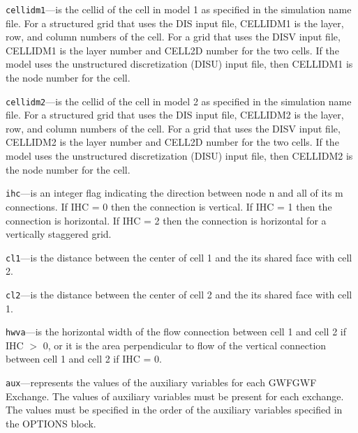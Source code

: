 \begin{description}
\item \texttt{cellidm1}---is the cellid of the cell in model 1 as specified in the simulation name file. For a structured grid that uses the DIS input file, CELLIDM1 is the layer, row, and column numbers of the cell.   For a grid that uses the DISV input file, CELLIDM1 is the layer number and CELL2D number for the two cells.  If the model uses the unstructured discretization (DISU) input file, then CELLIDM1 is the node number for the cell.

\item \texttt{cellidm2}---is the cellid of the cell in model 2 as specified in the simulation name file. For a structured grid that uses the DIS input file, CELLIDM2 is the layer, row, and column numbers of the cell.   For a grid that uses the DISV input file, CELLIDM2 is the layer number and CELL2D number for the two cells.  If the model uses the unstructured discretization (DISU) input file, then CELLIDM2 is the node number for the cell.

\item \texttt{ihc}---is an integer flag indicating the direction between node n and all of its m connections. If IHC = 0 then the connection is vertical.  If IHC = 1 then the connection is horizontal. If IHC = 2 then the connection is horizontal for a vertically staggered grid.

\item \texttt{cl1}---is the distance between the center of cell 1 and the its shared face with cell 2.

\item \texttt{cl2}---is the distance between the center of cell 2 and the its shared face with cell 1.

\item \texttt{hwva}---is the horizontal width of the flow connection between cell 1 and cell 2 if IHC $>$ 0, or it is the area perpendicular to flow of the vertical connection between cell 1 and cell 2 if IHC = 0.

\item \texttt{aux}---represents the values of the auxiliary variables for each GWFGWF Exchange. The values of auxiliary variables must be present for each exchange. The values must be specified in the order of the auxiliary variables specified in the OPTIONS block.

\end{description}

